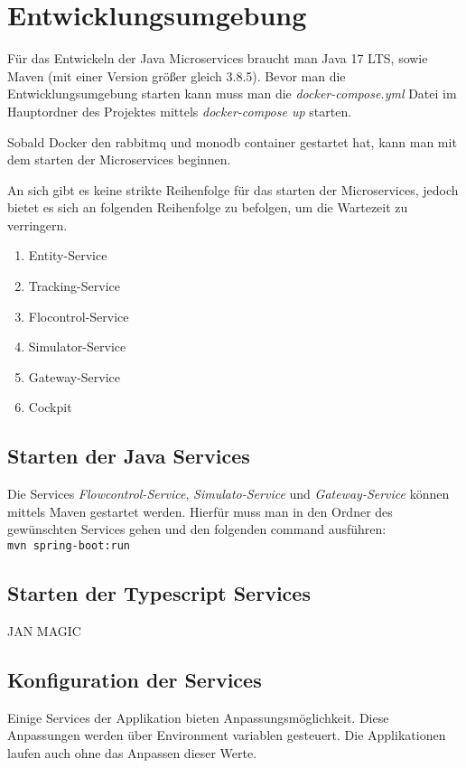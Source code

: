 \section{Entwicklungsumgebung}


Für das Entwickeln der Java Microservices braucht man Java 17 LTS, sowie Maven (mit einer Version größer gleich 3.8.5). Bevor man die Entwicklungsumgebung starten kann muss man die \textit{docker-compose.yml} Datei im Hauptordner des Projektes mittels \textit{docker-compose up} starten.

Sobald Docker den rabbitmq und monodb container gestartet hat, kann man mit dem starten der Microservices beginnen. 

An sich gibt es keine strikte Reihenfolge für das starten der Microservices, jedoch bietet es sich an folgenden Reihenfolge zu befolgen, um die Wartezeit zu verringern. 

\begin{enumerate}
	\item Entity-Service
	\item Tracking-Service
	\item Flocontrol-Service
	\item Simulator-Service
	\item Gateway-Service
	\item Cockpit
\end{enumerate}

\subsection{Starten der Java Services}

Die Services \textit{Flowcontrol-Service}, \textit{Simulato-Service} und \textit{Gateway-Service} können mittels Maven gestartet werden. Hierfür muss man in den Ordner des gewünschten Services gehen und den folgenden command ausführen:  \\ \verb|mvn spring-boot:run|

\subsection{Starten der Typescript Services}
JAN MAGIC

\subsection{Konfiguration der Services}
Einige Services der Applikation bieten Anpassungsmöglichkeit. Diese Anpassungen werden über Environment variablen gesteuert. Die Applikationen laufen auch ohne das Anpassen dieser Werte.

